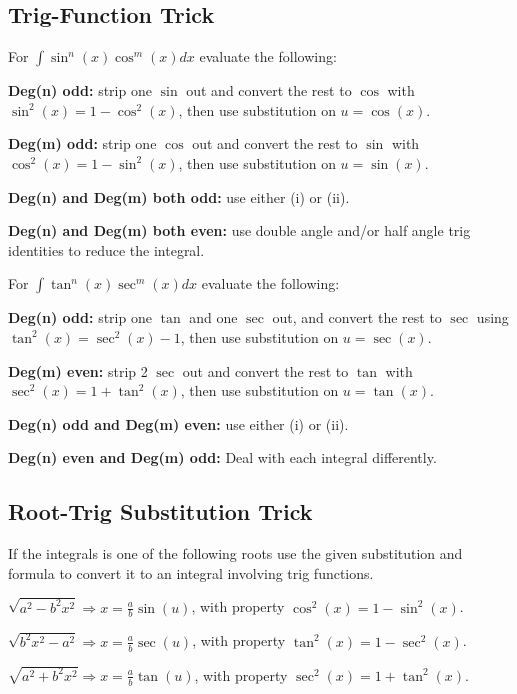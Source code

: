 \documentclass[8pt,a4paper]{extarticle}     %
\theoremstyle{definition}
\theoremstyle{definition}
\theoremstyle{definition}
\begin{document}
\begin{multicols}{4}
\subsection{Trig-Function Trick}
For $\int \sin^n(x)\cos^m(x)dx$ evaluate the following:
\begin{eqlist}
	\item \textbf{Deg(n) odd: } strip one $\sin$ out and convert the rest to $\cos$ with $\sin^2(x) = 1-\cos^2(x)$, then use substitution on $u=\cos(x)$.
	\item \textbf{Deg(m) odd: } strip one $\cos$ out and convert the rest to $\sin$ with $\cos^2(x) = 1-\sin^2(x)$, then use substitution on $u=\sin(x)$.
	\item \textbf{Deg(n) and Deg(m) both odd:} use either (i) or (ii).
	\item \textbf{Deg(n) and Deg(m) both even:} use double angle and/or half angle trig identities to reduce the integral.
\end{eqlist}
For $\int \tan^n(x)\sec^m(x)dx$ evaluate the following:
\begin{eqlist}
	\item \textbf{Deg(n) odd: } strip one $\tan$ and one $\sec$ out, and convert the rest to $\sec$ using $\tan^2(x) = \sec^2(x)-1$, then use substitution on $u=\sec(x)$.
	\item \textbf{Deg(m) even: } strip 2 $\sec$ out and convert the rest to $\tan$ with $\sec^2(x) = 1+\tan^2(x)$, then use substitution on $u=\tan(x)$.
	\item \textbf{Deg(n) odd and Deg(m) even:} use either (i) or (ii).
	\item \textbf{Deg(n) even and Deg(m) odd:} Deal with each integral differently.
\end{eqlist}
\subsection{Root-Trig Substitution Trick}
If the integrals is one of the following roots use the given substitution and formula to convert it to an integral involving trig functions.
\begin{eqlist}
	\item $\sqrt{a^2-b^2x^2} \Longrightarrow x = \frac{a}{b}\sin(u)$, with property $\cos^2(x)=1-\sin^2(x)$.
	\item $\sqrt{b^2x^2-a^2} \Longrightarrow x = \frac{a}{b}\sec(u)$, with property $\tan^2(x)=1-\sec^2(x)$.
	\item $\sqrt{a^2+b^2x^2} \Longrightarrow x = \frac{a}{b}\tan(u)$, with property $\sec^2(x)=1+\tan^2(x)$.
\end{eqlist}

\end{multicols}
\end{document}
